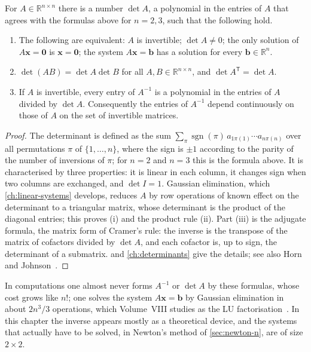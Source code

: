 \begin{theorem}
\label{thm:invertible-matrices}
For $A\in\mathbb R^{n\times n}$ there is a number $\det A$, a polynomial in the entries of $A$ that agrees with the formulas above for $n=2,3$, such that the following hold.
\begin{enumerate}
\item The following are equivalent: $A$ is invertible; $\det A\ne0$; the only solution of $A\mathbf x=\mathbf 0$ is $\mathbf x=\mathbf 0$; the system $A\mathbf x=\mathbf b$ has a solution for every $\mathbf b\in\mathbb R^n$.
\item $\det(AB)=\det A\det B$ for all $A,B\in\mathbb R^{n\times n}$, and $\det A^{\mathsf T}=\det A$.
\item If $A$ is invertible, every entry of $A^{-1}$ is a polynomial in the entries of $A$ divided by $\det A$. Consequently the entries of $A^{-1}$ depend continuously on those of $A$ on the set of invertible matrices.
\end{enumerate}
\end{theorem}

\begin{proof}
The determinant is defined as the sum $\sum_\pi\operatorname{sgn}(\pi)\,a_{1\pi(1)}\cdots a_{n\pi(n)}$ over all permutations $\pi$ of $\{1,\ldots,n\}$, where the sign is $\pm1$ according to the parity of the number of inversions of $\pi$; for $n=2$ and $n=3$ this is the formula above. It is characterised by three properties: it is linear in each column, it changes sign when two columns are exchanged, and $\det I=1$. Gaussian elimination, which \cref{ch:linear-systems} develops, reduces $A$ by row operations of known effect on the determinant to a triangular matrix, whose determinant is the product of the diagonal entries; this proves (i) and the product rule (ii). Part (iii) is the adjugate formula, the matrix form of Cramer's rule: the inverse is the transpose of the matrix of cofactors divided by $\det A$, and each cofactor is, up to sign, the determinant of a submatrix.  and \cref{ch:determinants} give the details; see also Horn and Johnson~\cite[Sects.~0.3 and~0.5]{horn2013}.
\end{proof}

In computations one almost never forms $A^{-1}$ or $\det A$ by these formulas, whose cost grows like $n!$; one solves the system $A\mathbf x=\mathbf b$ by Gaussian elimination in about $2n^3/3$ operations, which Volume~VIII studies as the LU factorisation~\cite{golub2013}. In this chapter the inverse appears mostly as a theoretical device, and the systems that actually have to be solved, in Newton's method of \cref{sec:newton-n}, are of size $2\times2$.

